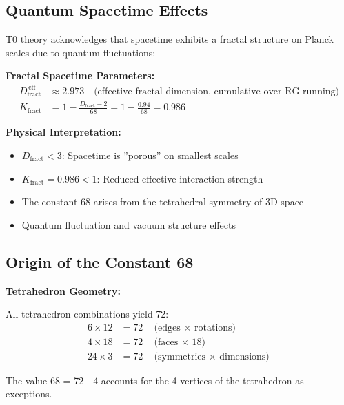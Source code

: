 	\subsection{Quantum Spacetime Effects}
	
	T0 theory acknowledges that spacetime exhibits a fractal structure on Planck scales due to quantum fluctuations:
	
	\begin{keyresult}
		\textbf{Fractal Spacetime Parameters:}
		\begin{align}
			D_{\text{fract}}^{\,\text{eff}} &\approx 2.973 \quad \text{(effective fractal dimension, cumulative over RG running)} \\
			K_{\text{fract}} &= 1 - \frac{D_{\text{fract}} - 2}{68} = 1 - \frac{0.94}{68} = 0.986
		\end{align}
		
		\textbf{Physical Interpretation:}
		\begin{itemize}
			\item $D_{\text{fract}} < 3$: Spacetime is ''porous'' on smallest scales
			\item $K_{\text{fract}} = 0.986 < 1$: Reduced effective interaction strength
			\item The constant 68 arises from the tetrahedral symmetry of 3D space
			\item Quantum fluctuation and vacuum structure effects
		\end{itemize}
	\end{keyresult}
	
	\subsection{Origin of the Constant 68}
	
	\begin{alternative}
		\textbf{Tetrahedron Geometry:}
		
		All tetrahedron combinations yield 72:
		\begin{align}
			6 \times 12 &= 72 \quad \text{(edges $\times$ rotations)} \\
			4 \times 18 &= 72 \quad \text{(faces $\times$ 18)} \\
			24 \times 3 &= 72 \quad \text{(symmetries $\times$ dimensions)}
		\end{align}
		
		The value 68 = 72 - 4 accounts for the 4 vertices of the tetrahedron as exceptions.
	\end{alternative}
	
